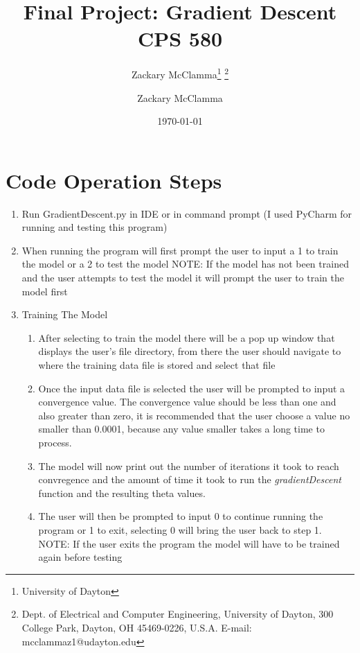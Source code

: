 \documentclass[10pt,a4paper]{article}
\begin{document}
	\title{Final Project: Gradient Descent CPS 580}
	\makeatletter
	
	\author{Zackary McClamma\thanks{University of Dayton}
	\thanks{Dept. of Electrical and Computer
			Engineering, University of Dayton, 300 College Park, Dayton, OH
			45469-0226, U.S.A. E-mail:
			mcclammaz1@udayton.edu}}
	
	\makeatother
	\author{Zackary McClamma}
	\date{\today}
	
	\maketitle
	\section{Code Operation Steps}
	\begin{enumerate}
		\item Run GradientDescent.py in IDE or in command prompt (I used PyCharm for running and testing this program)
		\item When running the program will first prompt the user to input a 1 to train the model or a 2 to test the model NOTE: If the model has not been trained and the user attempts to test the model it will prompt the user to train the model first
		\item Training The Model
		\begin{enumerate}
			\item After selecting to train the model there will be a pop up window that displays the user's file directory, from there the user should navigate to where the training data file is stored and select that file
			\item Once the input data file is selected the user will be prompted to input a convergence value. The convergence value should be less than one and also greater than zero, it is recommended that the user choose a value no smaller than 0.0001, because any value smaller takes a long time to process.
			\item The model will now print out the number of iterations it took to reach convregence and the amount of time it took to run the \textit{gradientDescent} function and the resulting theta values.
			\item The user will then be prompted to input 0 to continue running the program or 1 to exit, selecting 0 will bring the user back to step 1. NOTE: If the user exits the program the model will have to be trained again before testing
		\end{enumerate}

\end{enumerate}
\end{document}
